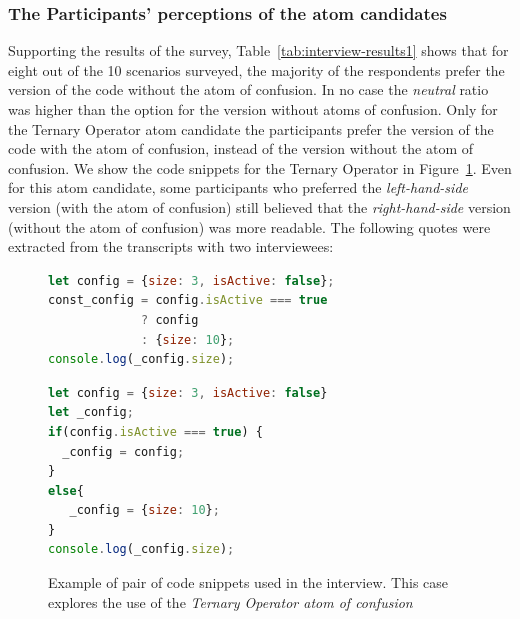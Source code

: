 \subsubsection*{The Participants' perceptions of the atom candidates}
Supporting the results of the survey, Table~\ref{tab:interview-results1}
 shows that for eight out of the
10 scenarios surveyed, the majority of the respondents prefer the version of the
code without the atom of confusion.
In no case the \emph{neutral}
ratio was higher than the option for the version without atoms of confusion.
Only for the Ternary Operator atom candidate the participants
prefer the version of the code with the atom of confusion,
instead of the version without the atom of confusion.
We show the code snippets for the Ternary Operator in Figure~\ref{code:ternary}.
Even for this atom candidate, some participants who preferred 
the \emph{left-hand-side} version (with the atom of confusion) 
still believed that the \emph{right-hand-side} version (without the atom of
confusion) was more readable.  
The following quotes were extracted from the transcripts with
two interviewees:

\begin{figure}

\noindent\begin{minipage}{.45\textwidth}
\begin{lstlisting}[language=JavaScript, caption=\emph{Left-hand side} (using the \emph{Ternary Operator} atom).]
let config = {size: 3, isActive: false};
const_config = config.isActive === true 
             ? config 
             : {size: 10};
console.log(_config.size);
\end{lstlisting}
\end{minipage}\hfill
\begin{minipage}{.45\textwidth}
\begin{lstlisting}[language=JavaScript, caption=\emph{Right-hand side} (without the atom).]
let config = {size: 3, isActive: false}
let _config;
if(config.isActive === true) {
  _config = config;
}
else{
   _config = {size: 10};
}
console.log(_config.size);
\end{lstlisting}
\end{minipage}
\caption{Example of pair of code snippets used in the interview. This case explores the use of the \emph{Ternary Operator atom of confusion}}
\label{code:ternary}
\end{figure}

